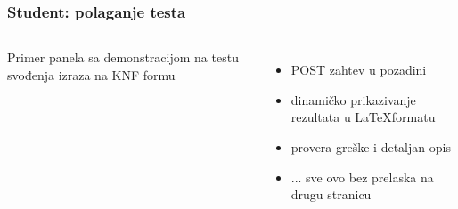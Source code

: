 \documentclass[compress,12pt,hyperref=unicode]{beamer}
\begin{document}
\begin{frame}
\frametitle{Student: polaganje testa}
\begin{columns}
\centering
{}
Primer panela sa demonstracijom na testu svođenja izraza na KNF formu
\begin{itemize}
\item POST zahtev u pozadini
\item dinamičko prikazivanje rezultata u \LaTeX \space formatu
\item provera greške i detaljan opis
\item ... sve ovo bez prelaska na drugu stranicu
\end{itemize}
\end{columns}
\end{frame}
\end{document}
